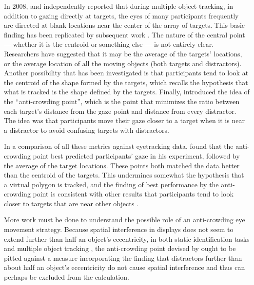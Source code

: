 \documentclass[
]{book}
\begin{document}
In 2008, \citet{zelinskyEyeMovementAnalysis2008} and \citet{fehdEyeMovementsMultiple2008} independently reported that during multiple object tracking, in addition to gazing directly at targets, the eyes of many participants frequently are directed at blank locations near the center of the array of targets. This basic finding has been replicated by subsequent work \citep{hyonaEyeBehaviorMultiple2019}. The nature of the central point --- whether it is the centroid or something else --- is not entirely clear. Researchers have suggested that it may be the average of the targets' locations, or the average location of all the moving objects (both targets and distractors). Another possibility that has been investigated is that participants tend to look at the centroid of the shape formed by the targets, which recalls the \citet{yantisMultielementVisualTracking1992} hypothesis that what is tracked is the shape defined by the targets. Finally, \citet{lukavskyEyeMovementsRepeated2013} introduced the idea of the ``anti-crowding point'', which is the point that minimizes the ratio between each target's distance from the gaze point and distance from every distractor. The idea was that participants move their gaze closer to a target when it is near a distractor to avoid confusing targets with distractors.

In a comparison of all these metrics against eyetracking data, \citet{lukavskyEyeMovementsRepeated2013} found that the anti-crowding point best predicted participants' gaze in his experiment, followed by the average of the target locations. These points both matched the data better than the centroid of the targets. This undermines somewhat the \citet{yantisMultielementVisualTracking1992} hypothesis that a virtual polygon is tracked, and the finding of best performance by the anti-crowding point is consistent with other results that participants tend to look closer to targets that are near other objects
\citep{vaterDisentanglingVisionAttention2017, zelinskyRoleRescueSaccades2010}.

More work must be done to understand the possible role of an anti-crowding eye movement strategy. Because spatial interference in displays does not seem to extend further than half an object's eccentricity, in both static identification tasks \citep[\citet{gurnseyCrowdingSizeEccentricity2011}]{pelliUncrowdedWindowObject2008} and multiple object tracking \citep{holcombeObjectTrackingAbsence2014}, the anti-crowding point devised by \citet{lukavskyEyeMovementsRepeated2013} ought to be pitted against a measure incorporating the finding that distractors further than about half an object's eccentricity do not cause spatial interference and thus can perhaps be excluded from the calculation.
\end{document}

